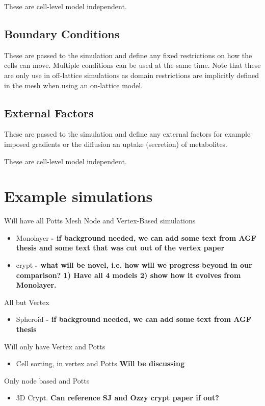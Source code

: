 \documentclass{siamltex}
\newcommand{\highlight}[1]{{\color{red} \bf{#1}}}
\begin{document}
These are cell-level model independent.


\subsection{Boundary Conditions} \label{sec:structure:bcs}
These are passed to the simulation and define any fixed restrictions on how the cells can move. 
Multiple conditions can be used at the same time.
Note that these are only use in off-lattice simulations as domain restrictions are implicitly defined in the mesh when using an on-lattice model.


\subsection{External Factors} \label{sec:structure:external}
These are passed to the simulation and define any external factors for example imposed gradients or the diffusion an uptake (secretion) of metabolites.

These are cell-level model independent.




\section{Example simulations} \label{sec:example_simulations}

Will have all Potts Mesh Node and Vertex-Based simulations
\begin{itemize}
  \item Monolayer \highlight{- if background needed, we can add some text from AGF thesis and some text that was cut out of the vertex paper}
  \item crypt \highlight{- what will be novel, i.e. how will we progress beyond \citet{Osborne2010Hybrid} in our comparison? 1) Have all 4 models 2) show how it evolves from Monolayer.}
\end{itemize}
All but Vertex
\begin{itemize}
  \item Spheroid \highlight{- if background needed, we can add some text from AGF thesis}
\end{itemize}
Will only have Vertex and Potts
\begin{itemize}
  \item Cell sorting, in vertex and Potts \highlight{Will  be discussing }
\end{itemize}
Only node based and Potts
\begin{itemize}
  \item 3D Crypt. \highlight{Can reference SJ and Ozzy crypt paper if out?}
\end{itemize}
\end{document}
